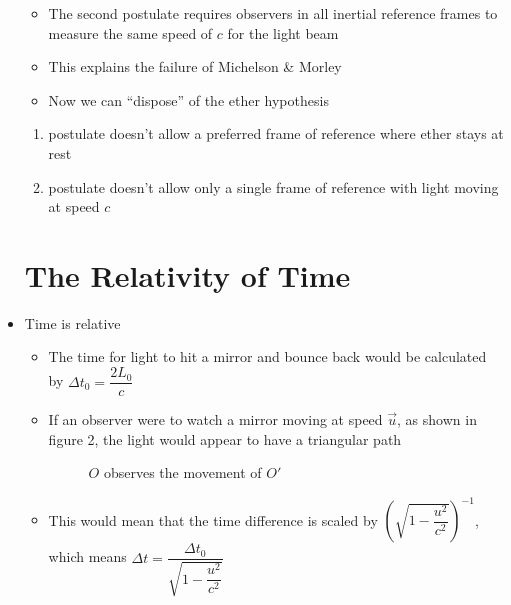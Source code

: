 \begin{itemize}
\begin{enumerate}
    \end{enumerate}

    \begin{itemize}

      \item The second postulate requires observers in all inertial reference frames to measure the same speed of $c$ for the light beam

      \item This explains the failure of Michelson \& Morley

      \item Now we can ``dispose'' of the ether hypothesis

    \end{itemize}

    \begin{enumerate}

      \item {} postulate doesn't allow a preferred frame of reference where ether stays at rest

      \item {} postulate doesn't allow only a single frame of reference with light moving at speed $c$

    \end{enumerate}

    \section{The Relativity of Time}

  \item Time is relative

    \begin{itemize}

      \item The time for light to hit a mirror and bounce back would be calculated by $\boxed{\Delta t_0=\dfrac{2L_0}{c}}$

      \item If an observer were to watch a mirror moving at speed $\overrightarrow{u}$, as shown in figure 2, the light would appear to have a triangular path

        \begin{figure}[h!]
          \centering
          
          \caption{$O$ observes the movement of $O'$}
          \label{fig:2}
        \end{figure}

      \item This would mean that the time difference is scaled by $\left(\sqrt{1-\dfrac{u^2}{c^2}}\right)^{-1}$, which means $\boxed{\Delta t = \dfrac{\Delta t_0}{\sqrt{1-\dfrac{u^2}{c^2}}}}$


\end{itemize}
\end{itemize}
